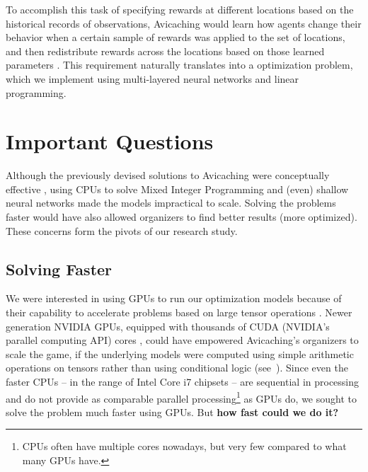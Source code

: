 To accomplish this task of specifying rewards at different locations based on the historical records of observations, Avicaching would learn how agents change their behavior when a certain sample of rewards was applied to the set of locations, and then redistribute rewards across the locations based on those learned parameters \cite{Xue2016Avi2}. This requirement naturally translates into a  optimization problem, which we implement using multi-layered neural networks and linear programming.

\section{Important Questions} \label{sec:Important Questions}
Although the previously devised solutions to Avicaching were conceptually effective \cite{Xue2016Avi1, Xue2016Avi2}, using CPUs to solve Mixed Integer Programming and (even) shallow neural networks made the models impractical to scale. Solving the problems faster would have also allowed organizers to find better results (more optimized). These concerns form the pivots of our research study.

\subsection{Solving Faster} \label{sec:Important Questions - Solving Faster}
We were interested in using GPUs to run our optimization models because of their capability to accelerate problems based on large tensor operations \cite{ParallelNVIDIA, cuDNNPaper}. Newer generation NVIDIA GPUs, equipped with thousands of CUDA (NVIDIA's parallel computing API) cores \cite{NVIDIA}, could have empowered Avicaching's organizers to scale the game, if the underlying models were computed using simple arithmetic operations on tensors rather than using conditional logic (see~). Since even the faster CPUs -- in the range of Intel Core i7 chipsets -- are sequential in processing and do not provide as comparable parallel processing\footnote{CPUs often have multiple cores nowadays, but very few compared to what many GPUs have.} as GPUs do, we sought to solve the problem much faster using GPUs. But \textbf{how fast could we do it?}

